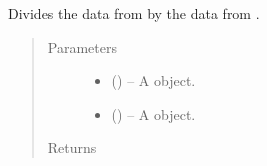 \documentclass[letterpaper,10pt,openany,oneside,english]{sphinxmanual}
\begin{document}
\begin{fulllineitems}
\label{\detokenize{additional_functions:fredpy.divide}}
Divides the data from  by the data from .
\begin{quote}\begin{description}
\item[{Parameters}] \leavevmode\begin{itemize}
\item {} 
 ({\hyperref[\detokenize{series_class:fredpy.series}]{}}) -- A {\hyperref[\detokenize{series_class:fredpy.series}]{}} object.

\item {} 
 ({\hyperref[\detokenize{series_class:fredpy.series}]{}}) -- A {\hyperref[\detokenize{series_class:fredpy.series}]{}} object.

\end{itemize}

\item[{Returns}] \leavevmode
{\hyperref[\detokenize{series_class:fredpy.series}]{}}

\end{description}\end{quote}

\end{fulllineitems}

\end{document}
